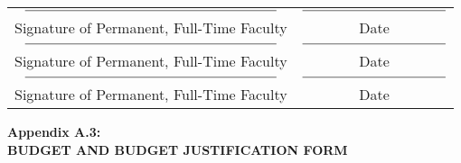 \documentclass[]{article}
\begin{document}
\begin{tabular}{cc}
 
$\rule{7cm}{0.15mm}$	& $\rule{4cm}{0.15mm}$ \\ 
 
Signature of Permanent, Full-Time Faculty	&  Date\\ 
 
$\rule{7cm}{0.15mm}$	&  $\rule{4cm}{0.15mm}$\\ 
 
Signature of Permanent, Full-Time Faculty	&  Date\\ 
	 
$\rule{7cm}{0.15mm}$	& $\rule{4cm}{0.15mm}$\\ 
	 
Signature of Permanent, Full-Time Faculty	&  Date\\ 
	 
\end{tabular} 

       
\newpage





\begin{center}
 \textbf{Appendix A.3:}\\
 	\textbf{BUDGET AND BUDGET JUSTIFICATION FORM}\\
\end{center}
\end{document}
